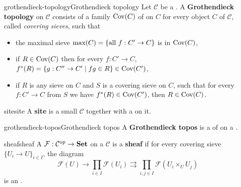 \begin{topic}{grothendieck-topology}{Grothendieck topology}
    Let $\mathcal{C}$ be a . A \textbf{Grothendieck topology} on $\mathcal{C}$ consists of a family $\textup{Cov}(C)$ of  on $C$ for every object $C$ of $\mathcal{C}$, called \textit{covering sieves}, such that
    \begin{itemize}
        \item the maximal sieve $\textup{max}(C) = \{ \text{all } f : C' \to C \}$ is in $\textup{Cov}(C)$,
        \item if $R \in \textup{Cov}(C)$ then for every $f : C' \to C$, $f^*(R) = \{ g : C'' \to C' \mid fg \in R \} \in \textup{Cov}(C')$,
        \item if $R$ is any sieve on $C$ and $S$ is a covering sieve on $C$, such that for every $f : C' \to C$ from $S$ we have $f^*(R) \in \textup{Cov}(C')$, then $R \in \textup{Cov}(C)$.
    \end{itemize}
\end{topic}

\begin{topic}{site}{site}
    A \textbf{site} is a small  $\mathcal{C}$ together with a  on it.
\end{topic}

\begin{topic}{grothendieck-topos}{Grothendieck topos}
    A \textbf{Grothendieck topos} is a  of  on a .
\end{topic}

\begin{topic}{sheaf}{sheaf}
    A  $\mathcal{F} : \mathcal{C}^\textup{op} \to \textbf{Set}$ on a  $\mathcal{C}$ is a \textbf{sheaf} if for every covering sieve $\{ U_i \to U \}_{i \in I}$, the diagram
    \[ \mathcal{F}(U) \to \prod_{i \in I} \mathcal{F}(U_i) \rightrightarrows \prod_{i, j \in I} \mathcal{F}(U_i \times_U U_j) \]
    is an .
\end{topic}

